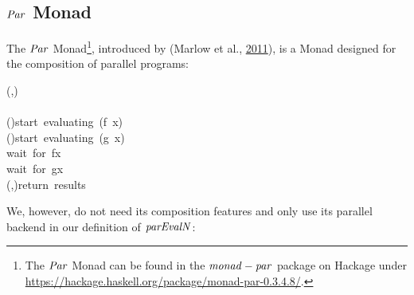 \documentclass[paper=A4,twoside=true,openright,parskip=full,chapterprefix=true,headings=normal,bibliography=totoc,listof=totoc,titlepage=on,captions=tableabove,draft=false,british]{scrreprt}%
\begin{document}
\hypertarget{par-monad}{%
\subsection{\texorpdfstring{\ensuremath{\Conid{Par}} Monad}{ Monad}}\label{par-monad}}

\label{sec:ParIntro}

The \ensuremath{\Conid{Par}} Monad\footnote{The \ensuremath{\Conid{Par}} Monad can be found in the \ensuremath{\Varid{monad}\mathbin{-}\Varid{par}}
  package on Hackage under
  \url{https://hackage.haskell.org/package/monad-par-0.3.4.8/}.},
introduced by (Marlow et al., \protect\hyperlink{ref-par-monad}{2011}),
is a Monad designed for the composition of parallel programs:


\begin{hscode}\SaveRestoreHook
{}%
%
%
%
%
%
%
\>[B]{}\mathbin{::}\;(,){}\<[E]%
\\
\>[B]{}\mathrel{=}\<[E]%
\\
\>[B]{}\<[6]%
\>[6]{}\leftarrow {}\mathbin{\$}\;(\;){}\<[34]%
\>[34]{}\mbox{\onelinecomment  start evaluating (f x)}{}\<[E]%
\\
\>[B]{}\<[6]%
\>[6]{}\leftarrow {}\mathbin{\$}\;(\;){}\<[35]%
\>[35]{}\mbox{\onelinecomment  start evaluating (g x)}{}\<[E]%
\\
\>[B]{}\<[6]%
\>[6]{}\<[9]%
\>[9]{}\leftarrow {}\;\<[26]%
\>[26]{}\mbox{\onelinecomment  wait for fx}{}\<[E]%
\\
\>[B]{}\<[6]%
\>[6]{}\<[9]%
\>[9]{}\leftarrow {}\;\<[26]%
\>[26]{}\mbox{\onelinecomment  wait for gx}{}\<[E]%
\\
\>[B]{}\<[6]%
\>[6]{}\;(,){}\<[26]%
\>[26]{}\mbox{\onelinecomment  return results}{}\<[E]%
\ColumnHook
\end{hscode}\resethooks
\vspace{-2\baselineskip}

We, however, do not need its composition features and only use its
parallel backend in our definition of \ensuremath{\Varid{parEvalN}}:
\end{document}

